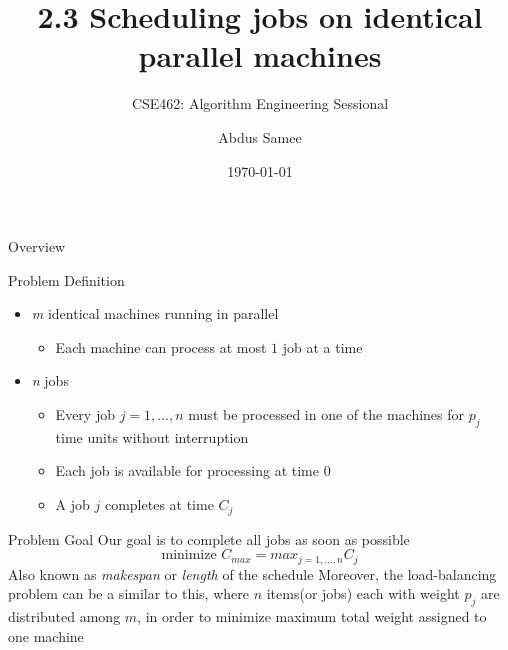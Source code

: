 \documentclass[aspectratio=169,xcolor=dvipsnames, t]{beamer}
\title[Section 2.3]{2.3 Scheduling jobs on identical parallel machines} %
\subtitle{CSE462: Algorithm Engineering Sessional}
\author[Samee]{Abdus Samee}
\institute[CSE462]{1805021 \newline Computer Science \& Engineering\newline Bangladesh University of Engineering  \& Technology}
\date{\today} %
\begin{document}
\maketitlepage

\begin{frame}[t]{Overview}
    \tableofcontents
\end{frame}


\begin{frame}{Problem Definition}
    \begin{itemize}
        \item \textit{m} identical machines running in parallel \pause
        \begin{itemize}
            \item Each machine can process at most $1$ job at a time \pause
        \end{itemize}
        \item \textit{n} jobs \pause
        \begin{itemize}
            \item Every job $j=1,...,n$ must be processed in one of the machines for $p_j$ time units without interruption \pause
            \item Each job is available for processing at time $0$ \pause
            \item A job $j$ completes at time $C_j$
        \end{itemize}
    \end{itemize}
\end{frame}

\begin{frame}{Problem Goal}
    Our goal is to complete all jobs as soon as possible \pause
    \begin{equation*}
        \text{minimize } C_{max} = max_{j=1,...,n}C_j
    \end{equation*}
    Also known as \alert{\textit{makespan}} or \alert{\textit{length}} of the schedule \pause
    \newline \newline
    Moreover, the load-balancing problem can be a similar to this, where $n$ items(or jobs) each with weight $p_j$ are distributed among $m$, in order to minimize maximum total weight assigned to one machine
\end{frame}
\end{document}
